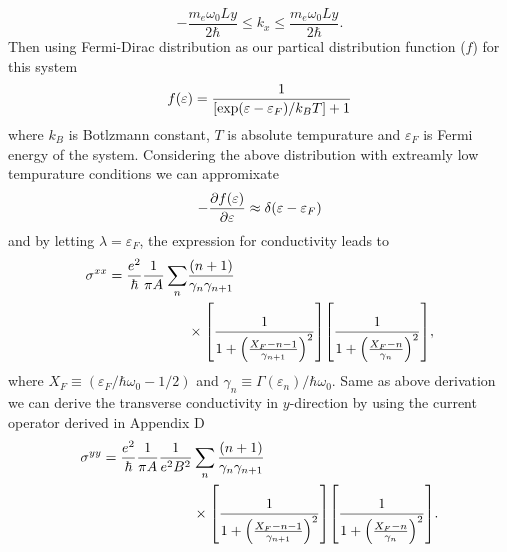 \begin{equation} \label{eq_31}
 -\frac{m_e\omega_0 Ly}{2\hbar} \leq k_x \leq \frac{m_e\omega_0 Ly}{2\hbar}.
\end{equation}
Then using Fermi-Dirac distribution as our partical distribution function ($f$) for this system
\begin{equation} \label{eq_32}
  f(\varepsilon) = \frac{1}{\qty[\exp(\varepsilon - \varepsilon_F)/k_B T]+1}
\end{equation}
where $k_B$ is Botlzmann constant, $T$ is absolute tempurature and $\varepsilon_F$ is Fermi energy of the system. Considering the above distribution with extreamly low tempurature conditions we can appromixate
\begin{equation} \label{eq_33}
  - \pdv{f(\varepsilon)}{\varepsilon} \approx \delta(\varepsilon - \varepsilon_F)
\end{equation}
and by letting $\lambda = \varepsilon_F$, the expression for conductivity leads to
\begin{equation} \label{eq_34}
  \begin{aligned}
    {\sigma}^{xx}  =
    \frac{e^2}{\hbar}
    \frac{1}{\pi A}
    \sum_{n} &
    \frac{\qty(n+1)}{\gamma_{n}\gamma_{n+1}} \\
    &\times
    \qty[
      \frac{1}
      {
        1 + \qty(\frac{X_F - n -1}{\gamma_{n+1}})^2
      }
    ]
    \qty[
      \frac{1}
      {
        1 + \qty(\frac{X_F - n}{\gamma_{n}})^2
      }
    ],
  \end{aligned}
\end{equation}
where $X_F \equiv ({\varepsilon_F}/{\hbar \omega_0} - {1}/{2})$
and
$\gamma_n \equiv {\Gamma(\varepsilon_n)}/{\hbar \omega_0}$.
Same as above derivation we can derive the transverse conductivity in $y$-direction by using the current operator derived in Appendix D
\begin{equation} \label{eq_35}
  \begin{aligned}
    {\sigma}^{yy} =
    \frac{e^2}{\hbar}
    \frac{1}{\pi A}
    \frac{1}{e^2B^2} &
    \sum_{n}
    \frac{\qty(n+1)}{\gamma_{n}\gamma_{n+1}} \\
    & \times
    \qty[
      \frac{1}
      {
        1 + \qty(\frac{X_F - n -1}{\gamma_{n+1}})^2
      }
    ]
    \qty[
      \frac{1}
      {
        1 + \qty(\frac{X_F - n}{\gamma_{n}})^2
      }
    ].
  \end{aligned}
\end{equation}
